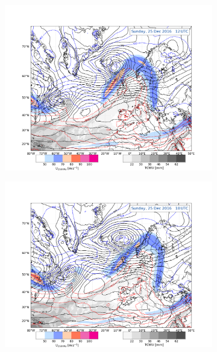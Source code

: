 \begin{figure}
	\begin{subfigure}[b]{0.49\textwidth}
		\includegraphics[trim={4.2cm 0cm 4.3cm 5.1cm},clip,
		width=\textwidth]{./fig_Geopot_Jet/20161225_12}
		\caption{} \label{fig:GP25}
	\end{subfigure}
	\begin{subfigure}[b]{0.49\textwidth}
		\includegraphics[trim={4.2cm 0cm 4.3cm 5.1cm},clip,
		width=\textwidth]{./fig_Geopot_Jet/20161225_18}
		\caption{} \label{fig:GP25_18}
	\end{subfigure}
	\begin{subfigure}[b]{0.49\textwidth}

\end{subfigure}
\end{figure}
